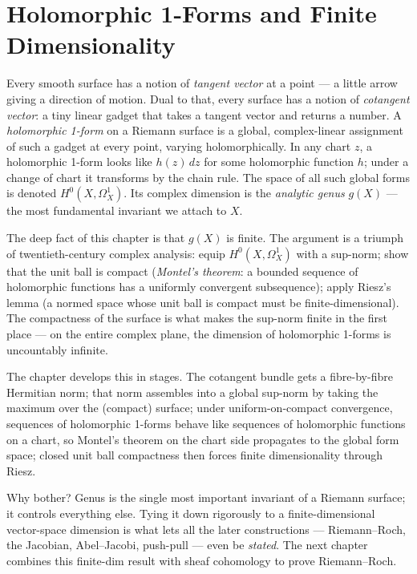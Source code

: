 \section{Holomorphic 1-Forms and Finite Dimensionality}
\label{sec:holomorphic-forms-finite-dim}

\begin{layman}
Every smooth surface has a notion of \emph{tangent vector} at a
point --- a little arrow giving a direction of motion. Dual to that,
every surface has a notion of \emph{cotangent vector}: a tiny linear
gadget that takes a tangent vector and returns a number. A
\emph{holomorphic 1-form} on a Riemann surface is a global,
complex-linear assignment of such a gadget at every point, varying
holomorphically. In any chart \(z\), a holomorphic 1-form looks like
\(h(z)\,dz\) for some holomorphic function \(h\); under a change of
chart it transforms by the chain rule. The space of all such global
forms is denoted \(H^0(X,\Omega^1_X)\). Its complex dimension is the
\emph{analytic genus} \(g(X)\) --- the most fundamental invariant we
attach to \(X\).

The deep fact of this chapter is that \(g(X)\) is finite. The
argument is a triumph of twentieth-century complex analysis: equip
\(H^0(X,\Omega^1_X)\) with a sup-norm; show that the unit ball is
compact (\emph{Montel's theorem}: a bounded sequence of holomorphic
functions has a uniformly convergent subsequence); apply Riesz's
lemma (a normed space whose unit ball is compact must be
finite-dimensional). The compactness of the surface is what makes
the sup-norm finite in the first place --- on the entire complex
plane, the dimension of holomorphic 1-forms is uncountably infinite.

The chapter develops this in stages. The cotangent bundle gets a
fibre-by-fibre Hermitian norm; that norm assembles into a global
sup-norm by taking the maximum over the (compact) surface; under
uniform-on-compact convergence, sequences of holomorphic 1-forms
behave like sequences of holomorphic functions on a chart, so
Montel's theorem on the chart side propagates to the global form
space; closed unit ball compactness then forces finite
dimensionality through Riesz.

Why bother? Genus is the single most important invariant of a
Riemann surface; it controls everything else. Tying it down
rigorously to a finite-dimensional vector-space dimension is what
lets all the later constructions --- Riemann--Roch, the Jacobian,
Abel--Jacobi, push-pull --- even be \emph{stated}. The next chapter
combines this finite-dim result with sheaf cohomology to prove
Riemann--Roch.
\end{layman}

